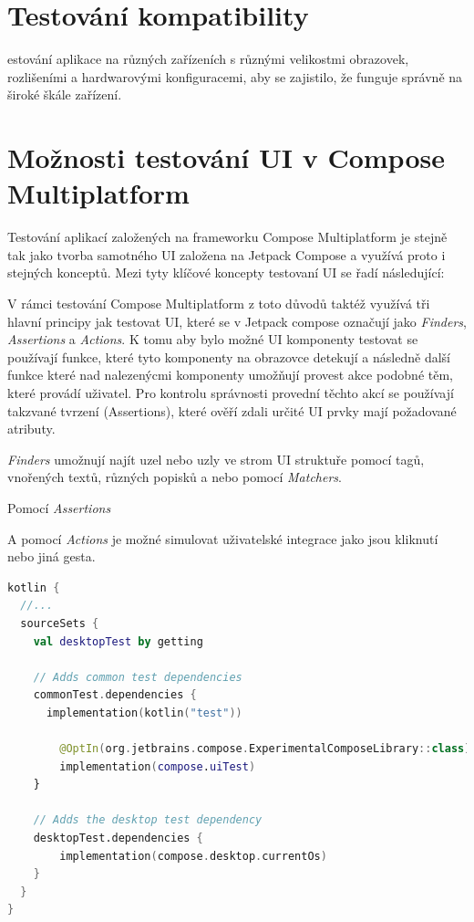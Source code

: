 \section{Testování kompatibility}
estování aplikace na různých zařízeních s různými velikostmi obrazovek, rozlišeními a hardwarovými konfiguracemi, aby se zajistilo, že funguje 
správně na široké škále zařízení.




\section{Možnosti testování UI v Compose Multiplatform}
Testování aplikací založených na frameworku Compose Multiplatform je stejně tak jako tvorba samotného UI založena na Jetpack Compose a využívá 
proto i stejných konceptů. Mezi tyty klíčové koncepty testovaní UI se řadí následující:


V rámci testování
Compose Multiplatform z toto důvodů taktéž využívá tři hlavní principy jak testovat UI, které se v Jetpack compose
označují jako \textit{Finders}, \textit{Assertions} a \textit{Actions}. 
K tomu aby bylo možné UI komponenty testovat se používají funkce, které tyto komponenty na obrazovce detekují a následně další funkce které nad nalezenýcmi 
komponenty umožňují provest akce podobné těm, které provádí uživatel. Pro kontrolu správnosti provední těchto akcí se používají takzvané tvrzení 
(Assertions), které ověří zdali určité UI prvky mají požadované atributy.

\textit{Finders} umožnují najít uzel nebo uzly ve strom UI struktuře pomocí tagů, vnořených textů, různých popisků a nebo pomocí \textit{Matchers}.


Pomocí \textit{Assertions}

A pomocí \textit{Actions} je možné simulovat uživatelské integrace jako jsou kliknutí nebo jiná gesta. \cite{composeTesting}


\begin{lstlisting}[caption={Integrace testů Gradle}, label={lst:testsIntegration}, language=Kotlin]
kotlin {
  //...
  sourceSets {
    val desktopTest by getting

    // Adds common test dependencies
    commonTest.dependencies {
      implementation(kotlin("test"))

        @OptIn(org.jetbrains.compose.ExperimentalComposeLibrary::class)
        implementation(compose.uiTest)
    }

    // Adds the desktop test dependency
    desktopTest.dependencies {
        implementation(compose.desktop.currentOs)
    }
  }
}
\end{lstlisting}
